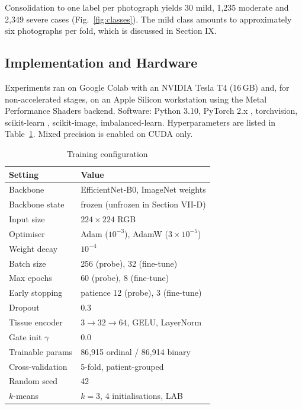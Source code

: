 Consolidation to one label per photograph yields 30 mild, 1{,}235 moderate
and 2{,}349 severe cases (Fig.~\ref{fig:classes}). The mild class amounts
to approximately six
photographs per fold, which is discussed in Section IX.

\subsection{Implementation and Hardware}

Experiments ran on Google Colab with an NVIDIA Tesla T4 (16\,GB) and, for
non-accelerated stages, on an Apple Silicon workstation using the Metal
Performance Shaders backend. Software: Python 3.10, PyTorch 2.x
\cite{paszke2019}, torchvision, scikit-learn \cite{pedregosa2011},
scikit-image, imbalanced-learn. Hyperparameters are listed in
Table~\ref{tab:hyper}. Mixed precision is enabled on CUDA only.

\begin{table}[!t]
\caption{Training configuration}
\label{tab:hyper}
\centering
\small
\begin{tabular}{@{}ll@{}}
\toprule
Setting & Value \\
\midrule
Backbone            & EfficientNet-B0, ImageNet weights \\
Backbone state      & frozen (unfrozen in Section VII-D) \\
Input size          & $224 \times 224$ RGB \\
Optimiser           & Adam ($10^{-3}$), AdamW ($3\times10^{-5}$) \\
Weight decay        & $10^{-4}$ \\
Batch size          & 256 (probe), 32 (fine-tune) \\
Max epochs          & 60 (probe), 8 (fine-tune) \\
Early stopping      & patience 12 (probe), 3 (fine-tune) \\
Dropout             & 0.3 \\
Tissue encoder      & $3 \to 32 \to 64$, GELU, LayerNorm \\
Gate init $\gamma$  & 0.0 \\
Trainable params    & 86{,}915 ordinal / 86{,}914 binary \\
Cross-validation    & 5-fold, patient-grouped \\
Random seed         & 42 \\
$k$-means           & $k=3$, 4 initialisations, LAB \\
\bottomrule
\end{tabular}
\end{table}

